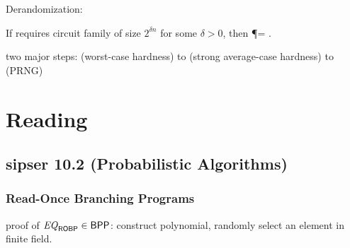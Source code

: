 \documentclass{article}
\begin{document}
Derandomization:

\begin{theorem}['98]
  If  requires circuit family of size \(2^{\delta n}\) for some \(\delta > 0\), then \P = \BPP.
\end{theorem}

two major steps: (worst-case hardness) to (strong average-case hardness) to (PRNG)

\section{Reading}

\subsection{sipser 10.2 (Probabilistic Algorithms)}

\subsubsection{Read-Once Branching Programs}

proof of \({\it EQ}_{\text{\sf ROBP}} \in \text{\sf BPP}\): construct polynomial, randomly select an element in finite field.
\end{document}
